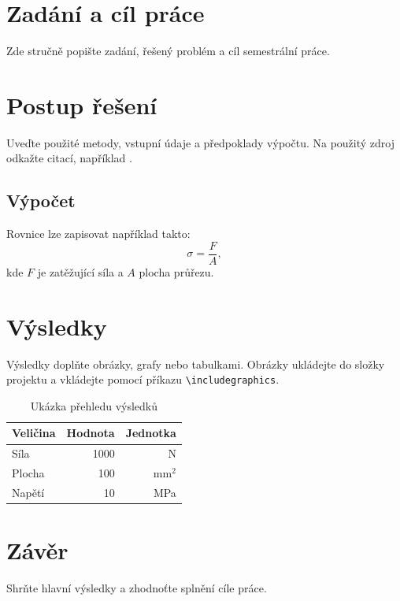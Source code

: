 \documentclass[a4paper,12pt]{article}
\begin{document}
\TitulniStrana
\section{Zadání a cíl práce}
Zde stručně popište zadání, řešený problém a cíl semestrální práce.

\section{Postup řešení}
Uveďte použité metody, vstupní údaje a předpoklady výpočtu.
Na použitý zdroj odkažte citací, například \cite{ukazka}.
\subsection{Výpočet}
Rovnice lze zapisovat například takto:
\begin{equation}
  \sigma = \frac{F}{A},
\end{equation}
kde $F$ je zatěžující síla a $A$ plocha průřezu.

\section{Výsledky}
Výsledky doplňte obrázky, grafy nebo tabulkami. Obrázky ukládejte
do složky projektu a vkládejte pomocí příkazu \verb|\includegraphics|.
\begin{table}[htbp]
  \centering
  \caption{Ukázka přehledu výsledků}
  \begin{tabular}{lrr}
    \hline
    Veličina & Hodnota & Jednotka \\
    \hline
    Síla & 1000 & N \\
    Plocha & 100 & mm$^2$ \\
    Napětí & 10 & MPa \\
    \hline
  \end{tabular}
\end{table}

\newpage
\section{Závěr}
Shrňte hlavní výsledky a zhodnoťte splnění cíle práce.



\end{document}
